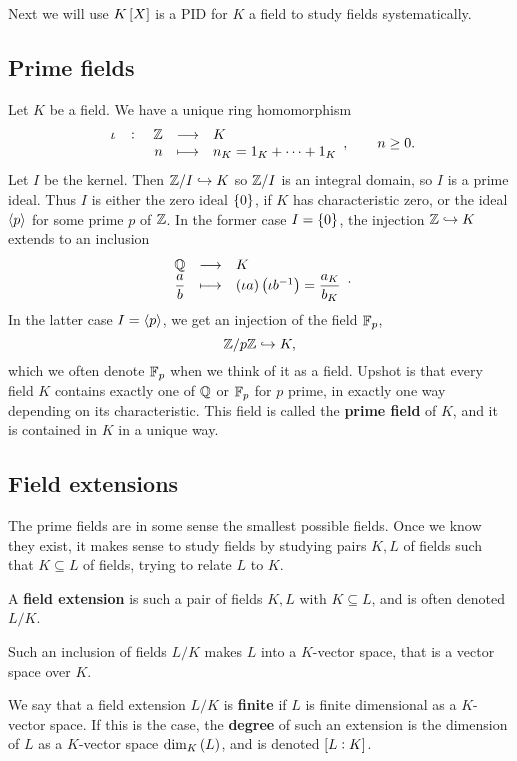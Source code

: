 
Next we will use $ K\sbr{X} $ is a PID for $ K $ a field to study fields systematically.

\subsection{Prime fields}

Let $ K $ be a field. We have a unique ring homomorphism
$$ \function[\iota]{\Z}{K}{n}{n_K = 1_K + \dots + 1_K}, \qquad n \ge 0. $$
Let $ I $ be the kernel. Then $ \mathbb{Z} / I \hookrightarrow K $ so $ \mathbb{Z} / I $ is an integral domain, so $ I $ is a prime ideal. Thus $ I $ is either the zero ideal $ \cbr{0} $, if $ K $ has characteristic zero, or the ideal $ \left\langle p \right\rangle $ for some prime $ p $ of $ \mathbb{Z} $. In the former case $ I = \cbr{0} $, the injection $ \mathbb{Z} \hookrightarrow K $ extends to an inclusion
$$ \function{\Q}{K}{\dfrac{a}{b}}{\br{\iota a}\br{\iota b^{-1}} = \dfrac{a_K}{b_K}}. $$
In the latter case $ I = \left\langle p \right\rangle $, we get an injection of the field $ \mathbb{F}_p $,
$$ \mathbb{Z} / p\mathbb{Z} \hookrightarrow K, $$
which we often denote $ \mathbb{F}_p $ when we think of it as a field. Upshot is that every field $ K $ contains exactly one of $ \mathbb{Q} $ or $ \mathbb{F}_p $ for $ p $ prime, in exactly one way depending on its characteristic. This field is called the \textbf{prime field} of $ K $, and it is contained in $ K $ in a unique way.

\subsection{Field extensions}

The prime fields are in some sense the smallest possible fields. Once we know they exist, it makes sense to study fields by studying pairs $ K, L $ of fields such that $ K \subseteq L $ of fields, trying to relate $ L $ to $ K $.

\begin{definition}
A \textbf{field extension} is such a pair of fields $ K, L $ with $ K \subseteq L $, and is often denoted $ L / K $.
\end{definition}

\begin{note*}
Such an inclusion of fields $ L / K $ makes $ L $ into a $ K $-vector space, that is a vector space over $ K $.
\end{note*}

\begin{definition}
We say that a field extension $ L / K $ is \textbf{finite} if $ L $ is finite dimensional as a $ K $-vector space. If this is the case, the \textbf{degree} of such an extension is the dimension of $ L $ as a $ K $-vector space $ \dim_K\br{L} $, and is denoted $ \sbr{L : K} $.
\end{definition}

